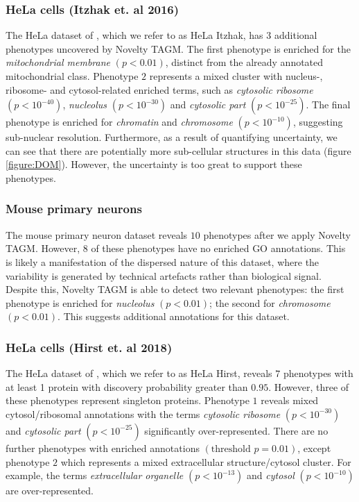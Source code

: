 \documentclass[12pt,english]{article}
\begin{document}
\subsubsection{HeLa cells (Itzhak et. al 2016)}
The HeLa dataset of \cite{Itzhak:2016}, which we refer to as HeLa Itzhak, has $3$ additional phenotypes uncovered by Novelty TAGM. The first phenotype is enriched for the \textit{mitochondrial membrane} $(p < 0.01)$, distinct from the already annotated mitochondrial class. Phenotype $2$ represents a mixed cluster with nucleus-, ribosome- and cytosol-related enriched terms, such as \textit{cytosolic ribosome} $(p < 10^{-40})$, \textit{nucleolus} $(p < 10^{-30})$ and \textit{cytosolic part} $(p < 10^{-25})$. The final phenotype is enriched for \textit{chromatin} and \textit{chromosome} $(p < 10^{-10})$, suggesting sub-nuclear resolution. Furthermore, as a result of quantifying uncertainty, we can see that there are potentially more sub-cellular structures in this data (figure \ref{figure:DOM}). However, the uncertainty is too great to support these phenotypes. 
\subsubsection{Mouse primary neurons}
The mouse primary neuron dataset reveals $10$ phenotypes after we apply Novelty TAGM. However, $8$ of these phenotypes have no enriched GO annotations. This is likely a manifestation of the dispersed nature of this dataset, where the variability is generated by technical artefacts rather than biological signal. Despite this, Novelty TAGM is able to detect two relevant phenotypes: the first phenotype is enriched for \textit{nucleolus} $(p < 0.01)$; the second for \textit{chromosome} $(p < 0.01)$. This suggests additional annotations for this dataset.
\subsubsection{HeLa cells (Hirst et. al 2018)}
The HeLa dataset of \cite{Hirst:2018}, which we refer to as HeLa Hirst, reveals $7$ phenotypes with at least 1 protein with discovery probability greater than $0.95$. However, three of these phenotypes represent singleton proteins. Phenotype $1$ reveals mixed cytosol/ribosomal annotations with the terms \textit{cytosolic ribosome} $(p < 10^{-30})$ and \textit{cytosolic part} $(p < 10^{-25})$ significantly over-represented. There are no further phenotypes with enriched annotations $(\text{threshold } p = 0.01)$, except phenotype $2$ which represents a mixed extracellular structure/cytosol cluster. For example, the terms \textit{extracellular organelle} $(p <10^{-13})$ and \textit{cytosol} $(p < 10^{-10})$ are over-represented.
\end{document}
